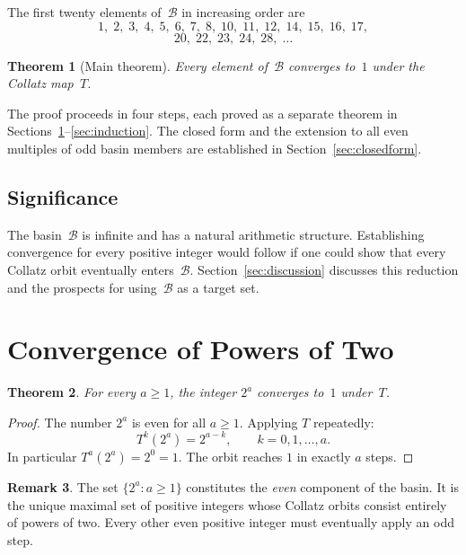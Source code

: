 \documentclass[12pt]{amsart}
\newtheorem{theorem}{Theorem}[section]
\theoremstyle{definition}
\newtheorem{remark}[theorem]{Remark}
\newcommand{\basin}{\mathcal{B}}
\begin{document}
The first twenty elements of~$\basin$ in increasing order are
\[
  1,\;2,\;3,\;4,\;5,\;6,\;7,\;8,\;10,\;11,\;12,\;14,\;15,\;16,\;17,
\]
\[
  20,\;22,\;23,\;24,\;28,\;\ldots
\]

\begin{theorem}[Main theorem]\label{thm:main}
  Every element of~$\basin$ converges to~$1$ under the Collatz map~$T$.
\end{theorem}

The proof proceeds in four steps, each proved as a separate theorem in
Sections~\ref{sec:powers2}--\ref{sec:induction}.
The closed form and the extension to all even multiples of odd basin members
are established in Section~\ref{sec:closedform}.

\subsection*{Significance}

The basin~$\basin$ is infinite and has a natural arithmetic structure.
Establishing convergence for every positive integer
would follow if one could show that every Collatz orbit eventually enters~$\basin$.
Section~\ref{sec:discussion} discusses this reduction and the prospects
for using~$\basin$ as a target set.

\section{Convergence of Powers of Two}\label{sec:powers2}

\begin{theorem}\label{thm:pow2}
  For every $a \geq 1$, the integer $2^a$ converges to~$1$ under~$T$.
\end{theorem}

\begin{proof}
  The number $2^a$ is even for all $a \geq 1$.
  Applying $T$ repeatedly:
  \[
    T^k(2^a) = 2^{a-k}, \qquad k = 0, 1, \ldots, a.
  \]
  In particular $T^a(2^a) = 2^0 = 1$.
  The orbit reaches $1$ in exactly $a$ steps.
\end{proof}

\begin{remark}
  The set $\{2^a : a \geq 1\}$ constitutes the \emph{even} component of the
  basin.  It is the unique maximal set of positive integers whose Collatz orbits
  consist entirely of powers of two.  Every other even positive integer must
  eventually apply an odd step.
\end{remark}
\end{document}
